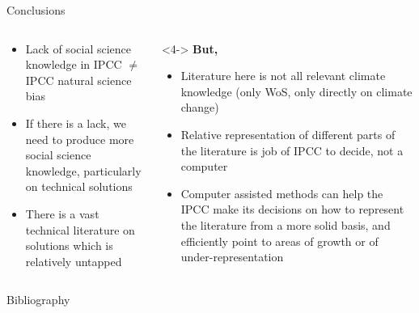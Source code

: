 \documentclass[9pt, aspectratio=169]{beamer}
\begin{document}
\begin{frame}{Conclusions}
\begin{columns}[t]
	\begin{column}{0.618\linewidth}
		\begin{itemize}
			\item<1-> Lack of social science knowledge in IPCC $ \neq $ IPCC natural science bias
			\item<2-> If there is a lack, we need to produce more social science knowledge, particularly on technical solutions
			\item<3-> There is a vast technical literature on solutions which is relatively untapped
		\end{itemize}
	
		\bigskip
		\bigskip
	\end{column}
	\begin{column}{0.382\linewidth}<4->
		\textbf{But,}
		\begin{itemize}
			\item<4-> Literature here is not all relevant climate knowledge (only WoS, only directly on climate change)
			\item<5-> Relative representation of different parts of the literature is job of IPCC to decide, not a computer
		\end{itemize}
		\begin{itemize}
			\item<6-> Computer assisted methods can help the IPCC make its decisions on how to represent the literature from a more solid basis, and efficiently point to areas of growth or of under-representation
		\end{itemize}
	\end{column}
\end{columns}
\end{frame}


\begin{frame}{Bibliography}
\scriptsize

\end{frame}
\end{document}
